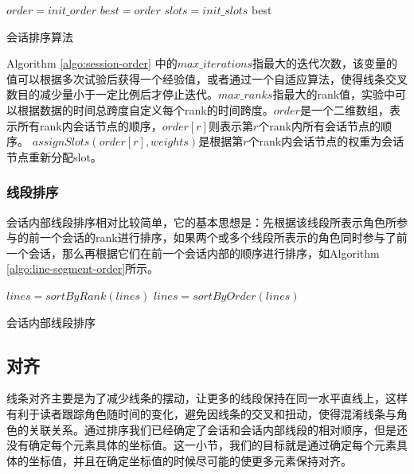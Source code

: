 \begin{algorithm}[!htb]
  $order = init\_order$\;
  $best = order$\;
  $slots = init\_slots$\;
  \Return best\;
  \caption{会话排序算法}
  \label{algo:session-order}
\end{algorithm}
Algorithm \ref{algo:session-order} 中的$max\_iterations$指最大的迭代次数，该变量的值可以根据多次试验后获得一个经验值，或者通过一个自适应算法，使得线条交叉数目的减少量小于一定比例后才停止迭代。$max\_ranks$指最大的rank值，实验中可以根据数据的时间总跨度自定义每个rank的时间跨度。$order$是一个二维数组，表示所有rank内会话节点的顺序，$order[r]$则表示第$r$个rank内所有会话节点的顺序。
$assignSlots(order[r], weights)$是根据第$r$个rank内会话节点的权重为会话节点重新分配slot。

\subsubsection{线段排序}
会话内部线段排序相对比较简单，它的基本思想是：先根据该线段所表示角色所参与的前一个会话的rank进行排序，如果两个或多个线段所表示的角色同时参与了前一个会话，那么再根据它们在前一个会话内部的顺序进行排序，如Algorithm \ref{algo:line-segment-order}所示。
\begin{algorithm}[!htb]
  \BlankLine
  $lines = sortByRank(lines)$\;
  $lines = sortByOrder(lines)$\;
  \caption{会话内部线段排序}
  \label{algo:line-segment-order}
\end{algorithm}

\subsection{对齐}
线条对齐主要是为了减少线条的摆动，让更多的线段保持在同一水平直线上，这样有利于读者跟踪角色随时间的变化，避免因线条的交叉和扭动，使得混淆线条与角色的关联关系。通过排序我们已经确定了会话和会话内部线段的相对顺序，但是还没有确定每个元素具体的坐标值。这一小节，我们的目标就是通过确定每个元素具体的坐标值，并且在确定坐标值的时候尽可能的使更多元素保持对齐。

